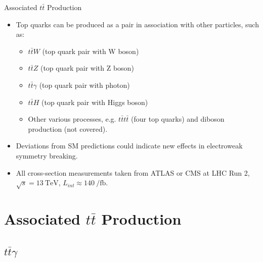 \documentclass{beamer}
\begin{document}
\begin{frame}{Associated $t\bar{t}$ Production}
  \begin{itemize}
    \item Top quarks can be produced as a pair in association with other particles, such as:
    \begin{itemize}
      \item $t\bar{t}W$ (top quark pair with W boson)
      \item $t\bar{t}Z$ (top quark pair with Z boson)
      \item $t\bar{t}\gamma$ (top quark pair with photon)
      \item $t\bar{t}H$ (top quark pair with Higgs boson)
      \item Other various processes, e.g. $t\bar{t}t\bar{t}$ (four top quarks) and diboson production (not covered).
    \end{itemize}
    \item Deviations from SM predictions could indicate new effects in electroweak symmetry breaking.
    \item All cross-section measurements taken from ATLAS or CMS at LHC Run 2, $\sqrt{s} = \qty{13}{\tera\electronvolt}$, $L_{int} \approx \qty{140}{\per\femto\barn}$.
  \end{itemize}
\end{frame}

\section{Associated $t\bar{t}$ Production}
\subsection{$t\bar{t}\gamma$}
\end{document}
